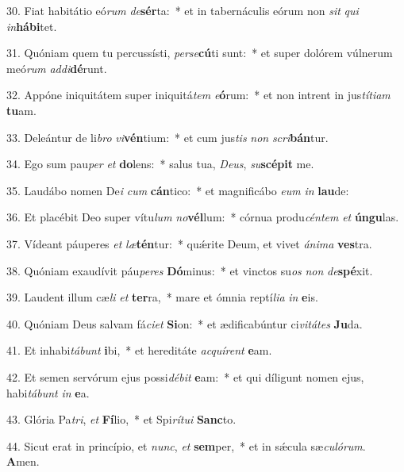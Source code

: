 30. Fiat habitátio eó\textit{rum} \textit{de}\textbf{sér}ta:~*  et in tabernáculis eórum non \textit{sit} \textit{qui} \textit{in}\textbf{há}\textbf{bi}tet.\

31. Quóniam quem tu percussísti, \textit{per}\textit{se}\textbf{cú}ti sunt:~*  et super dolórem vúlnerum meó\textit{rum} \textit{ad}\textit{di}\textbf{dé}runt.\

32. Appóne iniquitátem super iniquitá\textit{tem} \textit{e}\textbf{ó}rum:~*  et non intrent in jus\textit{tí}\textit{ti}\textit{am} \textbf{tu}am.\

33. Deleántur de li\textit{bro} \textit{vi}\textbf{vén}tium:~*  et cum jus\textit{tis} \textit{non} \textit{scri}\textbf{bán}tur.\

34. Ego sum pau\textit{per} \textit{et} \textbf{do}lens:~*  salus tua, \textit{De}\textit{us}, \textit{su}\textbf{scé}\textbf{pit} me.\

35. Laudábo nomen De\textit{i} \textit{cum} \textbf{cán}tico:~*  et magnificábo \textit{e}\textit{um} \textit{in} \textbf{lau}de:\

36. Et placébit Deo super vítu\textit{lum} \textit{no}\textbf{vél}lum:~*  córnua produ\textit{cén}\textit{tem} \textit{et} \textbf{ún}\textbf{gu}las.\

37. Vídeant páuperes \textit{et} \textit{læ}\textbf{tén}tur:~*  quǽrite Deum, et vivet \textit{á}\textit{ni}\textit{ma} \textbf{ves}tra.\

38. Quóniam exaudívit páu\textit{pe}\textit{res} \textbf{Dó}minus:~*  et vinctos su\textit{os} \textit{non} \textit{de}\textbf{spé}xit.\

39. Laudent illum cæ\textit{li} \textit{et} \textbf{ter}ra,~*  mare et ómnia reptí\textit{li}\textit{a} \textit{in} \textbf{e}is.\

40. Quóniam Deus salvam fá\textit{ci}\textit{et} \textbf{Si}on:~*  et ædificabúntur ci\textit{vi}\textit{tá}\textit{tes} \textbf{Ju}da.\

41. Et inhabi\textit{tá}\textit{bunt} \textbf{i}bi,~*  et hereditáte \textit{ac}\textit{quí}\textit{rent} \textbf{e}am.\

42. Et semen servórum ejus possi\textit{dé}\textit{bit} \textbf{e}am:~*  et qui díligunt nomen ejus, habi\textit{tá}\textit{bunt} \textit{in} \textbf{e}a.\

43. Glória Pa\textit{tri}, \textit{et} \textbf{Fí}lio,~*  et Spi\textit{rí}\textit{tu}\textit{i} \textbf{Sanc}to.\

44. Sicut erat in princípio, et \textit{nunc}, \textit{et} \textbf{sem}per,~*  et in sǽcula sæ\textit{cu}\textit{ló}\textit{rum}. \textbf{A}men.\

